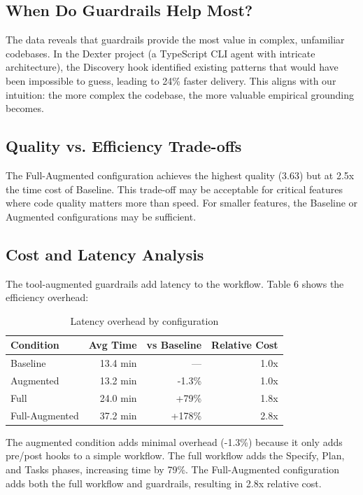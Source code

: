 \documentclass[sigconf,anonymous,review]{acmart}
\begin{document}
\subsection{When Do Guardrails Help Most?}

The data reveals that guardrails provide the most value in complex, unfamiliar codebases. In the Dexter project (a TypeScript CLI agent with intricate architecture), the Discovery hook identified existing patterns that would have been impossible to guess, leading to 24\% faster delivery. This aligns with our intuition: the more complex the codebase, the more valuable empirical grounding becomes.

\subsection{Quality vs. Efficiency Trade-offs}

The Full-Augmented configuration achieves the highest quality (3.63) but at 2.5x the time cost of Baseline. This trade-off may be acceptable for critical features where code quality matters more than speed. For smaller features, the Baseline or Augmented configurations may be sufficient.

\subsection{Cost and Latency Analysis}

The tool-augmented guardrails add latency to the workflow. Table 6 shows the efficiency overhead:

\begin{table}[ht]
  \centering
  \caption{Latency overhead by configuration}
  \label{tab:latency-overhead}
  \begin{tabular}{lrrr}
    \hline
    \textbf{Condition} & \textbf{Avg Time} & \textbf{vs Baseline} & \textbf{Relative Cost} \\
    \hline
    Baseline & 13.4 min & --- & 1.0x \\
    Augmented & 13.2 min & -1.3\% & 1.0x \\
    Full & 24.0 min & +79\% & 1.8x \\
    Full-Augmented & 37.2 min & +178\% & 2.8x \\
    \hline
  \end{tabular}
\end{table}

The augmented condition adds minimal overhead (-1.3\%) because it only adds pre/post hooks to a simple workflow. The full workflow adds the Specify, Plan, and Tasks phases, increasing time by 79\%. The Full-Augmented configuration adds both the full workflow and guardrails, resulting in 2.8x relative cost.
\end{document}
